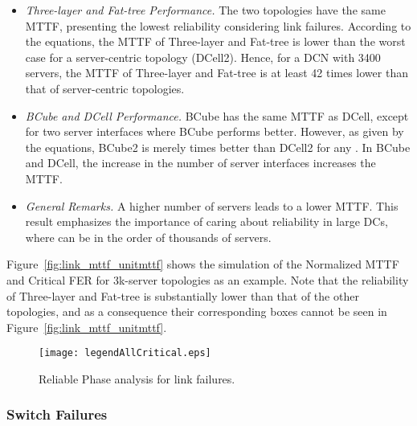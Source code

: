 \begin{itemize}
\item \textit{Three-layer and Fat-tree Performance.} The two topologies have the same MTTF, presenting the lowest reliability considering link failures. According to the equations, the MTTF of Three-layer and Fat-tree is  lower than the worst case for a server-centric topology (DCell2). Hence, for a DCN with 3400 servers, the MTTF of Three-layer and Fat-tree is at least 42 times lower than that of server-centric topologies.
\item \textit{BCube and DCell Performance.} BCube has the same MTTF as DCell, except for two server interfaces where BCube performs better. However, as given by the equations, BCube2 is merely  times better than DCell2 for any . In BCube and DCell, the increase in the number of server interfaces increases the MTTF.
\item \textit{General Remarks.} A higher number of servers  leads to a lower MTTF. This result emphasizes the importance of caring about reliability in large DCs, where  can be in the order of thousands of servers.
\end{itemize}
Figure~\ref{fig:link_mttf_unitmttf} shows the simulation of the Normalized MTTF and Critical FER for 3k-server topologies as an example. 
Note that the reliability of Three-layer and Fat-tree is substantially lower than that of the other topologies, and as a consequence their corresponding boxes cannot be seen in Figure~\ref{fig:link_mttf_unitmttf}.
\begin{figure}
\centering
{}
{\texttt{[image: legendAllCritical.eps]}}
\caption{Reliable Phase analysis for link failures.}
\end{figure}
\subsubsection{Switch Failures}
\label{sec:perfEvaluationSwitchReliable}

